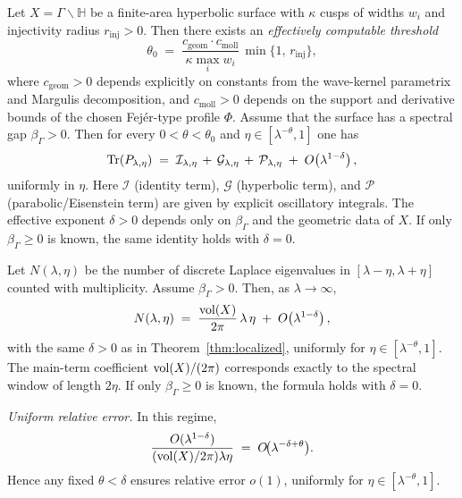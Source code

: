 \begin{theorem}\label{thm:localized}
Let $X=\Gamma\backslash\mathbb{H}$ be a finite-area hyperbolic surface with
$\kappa$ cusps of widths $w_i$ and injectivity radius $r_{\mathrm{inj}}>0$.
Then there exists an \emph{effectively computable threshold}
\[
  \theta_0
  \;=\;
  \frac{c_{\mathrm{geom}} \cdot c_{\mathrm{moll}}}{\kappa \max_i w_i}\,
  \min\{1,\,r_{\mathrm{inj}}\},
\]
where $c_{\mathrm{geom}}>0$ depends explicitly on constants from the wave-kernel
parametrix and Margulis decomposition, and $c_{\mathrm{moll}}>0$ depends on
the support and derivative bounds of the chosen Fejér-type profile $\Phi$.
Assume that the surface has a spectral gap $\beta_\Gamma>0$. Then for every
$0<\theta<\theta_0$ and $\eta\in[\lambda^{-\theta},1]$ one has
\[
  \operatorname{Tr}(P_{\lambda,\eta})
  \;=\; \mathcal{I}_{\lambda,\eta} \,+\, \mathcal{G}_{\lambda,\eta}
        \,+\, \mathcal{P}_{\lambda,\eta}
        \;+\; O\!\left(\lambda^{1-\delta}\right),
\]
uniformly in $\eta$. Here $\mathcal{I}$ (identity term), $\mathcal{G}$ (hyperbolic term),
and $\mathcal{P}$ (parabolic/Eisenstein term) are given by explicit oscillatory
integrals. The effective exponent $\delta>0$ depends only on $\beta_\Gamma$ and
the geometric data of $X$. If only $\beta_\Gamma \ge 0$ is known, the same
identity holds with $\delta=0$.
\end{theorem}

\begin{theorem}\label{thm:local-weyl}
Let $N(\lambda,\eta)$ be the number of discrete Laplace eigenvalues in
$[\lambda-\eta,\lambda+\eta]$ counted with multiplicity. Assume $\beta_\Gamma>0$.
Then, as $\lambda\to\infty$,
\[
  N(\lambda,\eta)
  \;=\; \frac{\operatorname{vol}(X)}{2\pi}\,\lambda\,\eta
  \;+\; O\!\left(\lambda^{1-\delta}\right),
\]
with the same $\delta>0$ as in Theorem~\ref{thm:localized}, uniformly for
$\eta\in[\lambda^{-\theta},1]$. The main-term coefficient $\operatorname{vol}(X)/(2\pi)$
corresponds exactly to the spectral window of length $2\eta$. If only
$\beta_\Gamma\ge0$ is known, the formula holds with $\delta=0$.
\end{theorem}

\noindent\emph{Uniform relative error.} In this regime,
\[
  \frac{O(\lambda^{1-\delta})}{(\operatorname{vol}(X)/2\pi)\lambda\eta}
  \;=\; O\!\bigl(\lambda^{-\delta+\theta}\bigr).
\]
Hence any fixed $\theta<\delta$ ensures relative error $o(1)$, uniformly for
$\eta \in [\lambda^{-\theta},1]$.

